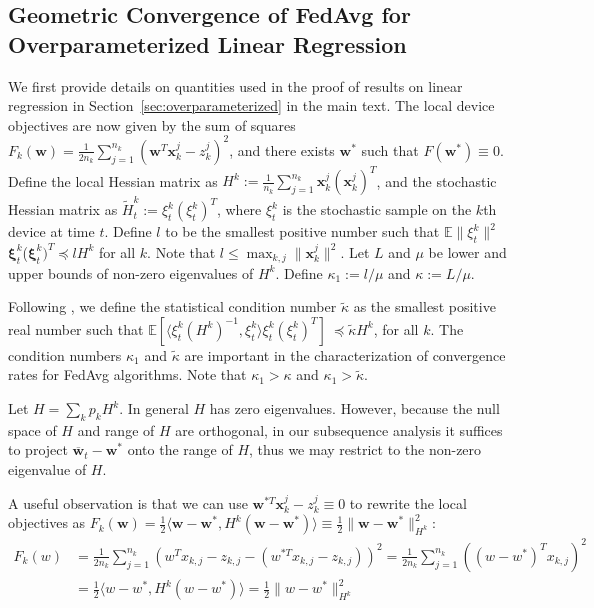 \subsection{Geometric Convergence of FedAvg for Overparameterized Linear Regression}

We first provide details on quantities used in the proof of results on linear regression in Section~\ref{sec:overparameterized} in the main text. The local device objectives are now given by the sum of squares {\small$F_{k}(\mathbf{w})=\frac{1}{2n_{k}}\sum_{j=1}^{n_{k}}(\mathbf{w}^{T}\mathbf{x}_{k}^{j}-z_{k}^{j})^{2}$},
and there exists $\mathbf{w}^{\ast}$ such that $F(\mathbf{w}^{\ast})\equiv0$. 
Define the local Hessian matrix as $H^{k}:=\frac{1}{n_{k}}\sum_{j=1}^{n_{k}}\mathbf{x}_{k}^{j}(\mathbf{x}_{k}^{j})^{T}$, and the stochastic Hessian matrix as $\tilde{H}_{t}^{k}:=\xi_{t}^{k}(\xi_{t}^{k})^{T}$, where $\xi_{t}^{k}$ is the stochastic sample on the $k$th device at
time $t$. Define $l$ to be the smallest positive number such that $\mathbb{E}\|\xi_{t}^{k}\|^{2}$$\mathbf{\xi}_{t}^{k}$($\mathbf{\xi}_{t}^{k})^{T}\preceq lH^{k}$ for all $k$. Note that $l\leq\max_{k,j}\|\mathbf{x}_{k}^{j}\|^{2}$.
Let $L$ and $\mu$ be lower and upper bounds of non-zero eigenvalues
of $H^{k}$. Define $\kappa_{1}:=l/\mu$ and $\kappa:=L/\mu$. 

Following
\cite{liu2018accelerating,jain2017accelerating}, we define the statistical
condition number $\tilde{\kappa}$ as the smallest positive real number
such that $\mathbb{E}\left[\langle\xi_{t}^{k}(H^{k})^{-1},\xi_{t}^{k}\rangle\xi_{t}^{k}(\xi_{t}^{k})^{T}\right] \  \preceq\tilde{\kappa}H^{k}$, for all $k$. 
The condition numbers $\kappa_{1}$ and $\tilde{\kappa}$
are important in the characterization of convergence rates for FedAvg
algorithms. Note that $\kappa_{1}>\kappa$ and $\kappa_{1}>\tilde{\kappa}$.


Let $H=\sum_{k}p_kH^k$. In general $H$ has zero eigenvalues. However, because the null space
of $H$ and range of $H$ are orthogonal, in our subsequence analysis
it suffices to project $\overline{\mathbf{w}}_{t}-\mathbf{w}^{\ast}$
onto the range of $H$, thus we may restrict to the non-zero eigenvalue
of $H$. 

A useful observation is that we can use $\mathbf{w}^{\ast T}\mathbf{x}_{k}^{j}-z_{k}^{j}\equiv0$
to rewrite the local objectives as $F_{k}(\mathbf{w})=\frac{1}{2}\langle\mathbf{w}-\mathbf{w}^{\ast},H^{k}(\mathbf{w}-\mathbf{w}^{\ast})\rangle\equiv\frac{1}{2}\|\mathbf{w}-\mathbf{w}^{\ast}\|_{H^{k}}^{2}$:
\begin{align*}
F_{k}(w) & =\frac{1}{2n_{k}}\sum_{j=1}^{n_{k}}(w^{T}x_{k,j}-z_{k,j}-(w^{\ast T}x_{k,j}-z_{k,j}))^{2}=\frac{1}{2n_{k}}\sum_{j=1}^{n_{k}}((w-w^{\ast})^{T}x_{k,j})^{2}\\
& =\frac{1}{2}\langle w-w^{\ast},H^{k}(w-w^{\ast})\rangle=\frac{1}{2}\|w-w^{\ast}\|_{H^{k}}^{2}
\end{align*}

